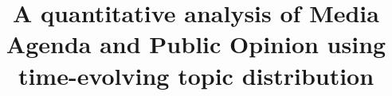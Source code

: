 \documentclass{bmcart}
\begin{document}
\begin{frontmatter}

\begin{fmbox}


\title{A quantitative analysis of Media Agenda and Public Opinion using time-evolving topic distribution}


\author[
   addressref={aff1,aff2},                   %
   email={spinto@df.uba.ar}   %
]{ }
\author[
   addressref={aff3},                   %
]{ }
\author[
   addressref={aff1,aff2},                   %
]{ }
\author[
   addressref={aff1,aff2},                   %
   email={balen@df.uba.ar}   %
]{ }



\end{fmbox}
\end{frontmatter}
\end{document}
